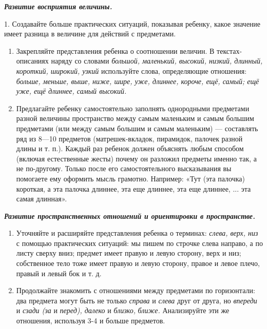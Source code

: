 \documentclass{book}
\renewcommand{\emph}[1]{\textit{#1}}
\begin{document}
\emph{\textbf{Развитие восприятия величины.}}

1. Создавайте больше практических ситуаций, показывая ребенку, какое
значение имеет разница в величине для действий с предметами.


\begin{enumerate}
\def\labelenumi{\arabic{enumi}.}
\setcounter{enumi}{1}
\item
  
  Закрепляйте представления ребенка о соотношении величин. В
  текстах-описаниях наряду со словами \emph{большой, маленький, высокий,
  низкий, длинный, короткий, широкий, узкий} используйте слова,
  определяющие отношения: \emph{больше, меньше, выше, ниже, шире, уже,
  длиннее, короче, ещё, самый; ещё уже, ещё длиннее, самый высокий.}
  
\item
  
  Предлагайте ребенку самостоятельно заполнять однородными предметами
  разной величины пространство между самым маленьким и самым большим
  предметами (или между самым большим и самым маленьким) --- составлять
  ряд из 8---10 предметов (матрешек-вкладок, пирамидок, палочек разной
  длины и т. п.). Каждый раз ребенок должен объяснять любым способом
  (включая естественные жесты) почему он разложил предметы именно так, а
  не по-другому. Только после его самостоятельного высказывания вы
  помогаете ему оформить мысль грамотно. Например: «Тут (эта палочка)
  короткая, а эта палочка длиннее, эта еще длиннее, эта еще длиннее, ...
  эта самая длинная».
  
\end{enumerate}


\emph{\textbf{Развитие пространственных отношений и ориентировки в
пространстве.}}


\begin{enumerate}
\def\labelenumi{\arabic{enumi}.}
\item
  
  Уточняйте и расширяйте представления ребенка о терминах: \emph{слева,
  верх, низ} с помощью практических ситуаций: мы пишем по строчке слева
  направо, а по листу сверху вниз; предмет имеет правую и левую сторону,
  верх и низ; собственное тело тоже имеет правую и левую сторону, правое
  и левое плечо, правый и левый бок и т. д.
  
\item
  
  Продолжайте знакомить с отношениями между предметами по горизонтали:
  два предмета могут быть не только \emph{справа} и \emph{слева} друг от
  друга, но \emph{впереди} и \emph{сзади (за} и \emph{перед), далеко} и
  \emph{близко,} \emph{ближе.} Анализируйте эти же отношения, используя
  3-4 и больше предметов.
  
\end{enumerate}
\end{document}
